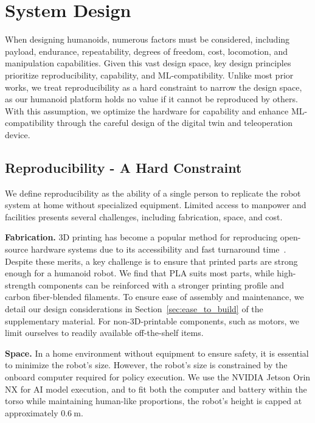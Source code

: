 \section{System Design}
\label{sec:design}




When designing humanoids, numerous factors must be considered, including payload, endurance, repeatability, degrees of freedom, cost, locomotion, and manipulation capabilities. Given this vast design space, \systems key design principles prioritize reproducibility, capability, and ML-compatibility. Unlike most prior works, we treat reproducibility as a hard constraint to narrow the design space, as our humanoid platform holds no value if it cannot be reproduced by others. With this assumption, we optimize the hardware for capability and enhance ML-compatibility through the careful design of the digital twin and teleoperation device.


\subsection{Reproducibility - A Hard Constraint} 
We define reproducibility as the ability of a single person to replicate the robot system at home without specialized equipment. Limited access to manpower and facilities presents several challenges, including fabrication, space, and cost.

\textbf{Fabrication.} 3D printing has become a popular method for reproducing open-source hardware systems due to its accessibility and fast turnaround time~\citep{kau2022stanford, shaw2023leap, wu2023gello}. Despite these merits, a key challenge is to ensure that printed parts are strong enough for a humanoid robot. We find that PLA suits most parts, while high-strength components can be reinforced with a stronger printing profile and carbon fiber-blended filaments. To ensure ease of assembly and maintenance, we detail our design considerations in Section~\ref{sec:ease_to_build} of the supplementary material. For non-3D-printable components, such as motors, we limit ourselves to readily available off-the-shelf items.

\textbf{Space.} In a home environment without equipment to ensure safety, it is essential to minimize the robot’s size. However, the robot's size is constrained by the onboard computer required for policy execution. We use the NVIDIA Jetson Orin NX for AI model execution, and to fit both the computer and battery within the torso while maintaining human-like proportions, the robot’s height is capped at approximately $0.6~\mathrm{m}$.

